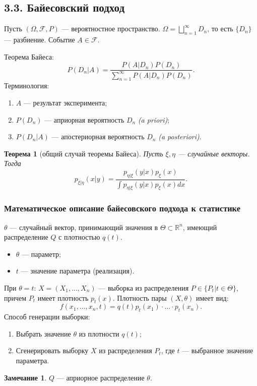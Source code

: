 \documentclass[12pt]{report}
\newtheorem{theorem}{Теорема}
\theoremstyle{definition}
\newtheorem{remark}{Замечание}
\begin{document}
\subsection{3.3. Байесовский подход}
Пусть $(\Omega, \mathcal{F}, P)$ — вероятностное пространство. $\Omega = \displaystyle{\bigsqcup_{n=1}^\infty} D_n$, то есть $\{D_n\}$ — разбиение. Событие $A \in \mathcal{F}$.

Теорема Байеса:
$$P(D_n | A) = \dfrac{P(A| D_n)P(D_n)}{\displaystyle{\sum_{n=1}^\infty} P(A|D_n)P(D_n)}.$$
Терминология:
\begin{enumerate}
	\item $A$ — результат эксперимента;
	\item $P(D_n)$ — априорная вероятность $D_n$ \emph{(a priori)};
	\item $P(D_n | A)$ — апостериорная вероятность $D_n$ \emph{(a posteriori)}.
\end{enumerate}
\begin{theorem}[общий случай теоремы Байеса]
	Пусть $\xi, \eta$ — случайные векторы. Тогда
	$$p_{\xi|\eta}(x|y) = \dfrac{p_{\eta | \xi}(y|x)p_\xi(x)}{\int p_{\eta|\xi}(y|x)p_\xi(x)dx}.$$
\end{theorem}
\subsubsection{Математическое описание байесовского подхода к статистике}
$\theta$ — случайный вектор, принимающий значения в $\Theta \subset \mathbb{R}^n$, имеющий распределение $Q$ с плотностью $q(t)$.
\begin{itemize}
	\item $\theta$ — параметр;
	\item $t$ — значение параметра (реализация).
\end{itemize}
При $\theta = t$: $X = (X_1, \ldots, X_n)$ — выборка из распределения $P \in \{P_t | t \in \Theta\}$, причем $P_t$ имеет плотность $p_t(x)$.
Плотность пары $(X, \theta)$ имеет вид:
$$f(x_1, \ldots, x_n, t) = q(t)p_t(x_1)\cdot \ldots \cdot p_t(x_n).$$
Способ генерации выборки:
\begin{enumerate}
	\item Выбрать значение $\theta$ из плотности $q(t)$;
	\item Сгенерировать выборку $X$ из распределения $P_t$, где $t$ — выбранное значение параметра.
\end{enumerate}
\begin{remark}
	$Q$ — априорное распределение $\theta$.
\end{remark}
\end{document}
